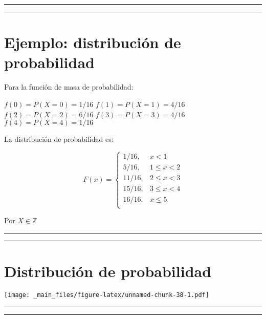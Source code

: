 \documentclass[
]{book}
\begin{document}
\begin{center}\rule{0.5\linewidth}{0.5pt}\end{center}

\begin{center}\rule{0.5\linewidth}{0.5pt}\end{center}

\hypertarget{ejemplo-distribuciuxf3n-de-probabilidad}{%
\section{Ejemplo: distribución de probabilidad}\label{ejemplo-distribuciuxf3n-de-probabilidad}}

Para la función de masa de probabilidad:

\(f(0)=P(X=0)=1/16\)
\(f(1)=P(X=1)=4/16\)
\(f(2)=P(X=2)=6/16\)
\(f(3)=P(X=3)=4/16\)
\(f(4)=P(X=4)=1/16\)

La distribución de probabilidad es:

\[
    F(x)=
\begin{cases}
    1/16, &  x < 1\\
    5/16,& 1\leq x < 2\\
    11/16,& 2\leq x < 3\\
    15/16,& 3\leq x < 4\\
    16/16,& x \leq 5\\
\end{cases}
\]

Por \(X \in \mathbb{Z}\)

\begin{center}\rule{0.5\linewidth}{0.5pt}\end{center}

\begin{center}\rule{0.5\linewidth}{0.5pt}\end{center}

\hypertarget{distribuciuxf3n-de-probabilidad-1}{%
\section{Distribución de probabilidad}\label{distribuciuxf3n-de-probabilidad-1}}

\texttt{[image: \_main\_files/figure-latex/unnamed-chunk-38-1.pdf]}

\begin{center}\rule{0.5\linewidth}{0.5pt}\end{center}

\begin{center}\rule{0.5\linewidth}{0.5pt}\end{center}
\end{document}
